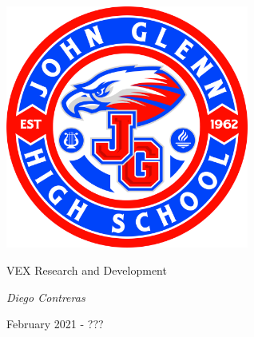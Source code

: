 \documentclass[12pt]{article}
\begin{document}

\begin{titlepage}
	\centering
	\includegraphics[width=8cm]{jghs_logo}\par\vspace{1cm}
	\vspace{1cm}
	\vspace{1cm}
	{\huge VEX Research and Development\par}
	\vspace{1cm}
	{\Large\itshape Diego Contreras\par}
	\vfill
	\vfill
	{\large February 2021 - ???}
\end{titlepage}

\newpage
\tableofcontents






















\end{document}
